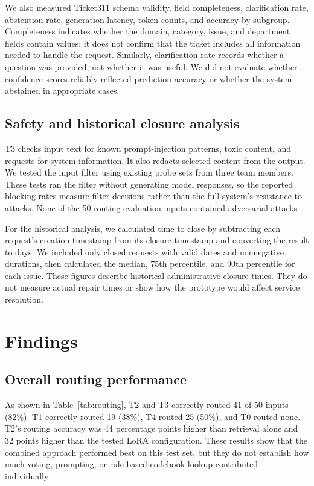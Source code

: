 \documentclass[11pt,letterpaper]{article}
\begin{document}
We also measured Ticket311 schema validity, field completeness, clarification rate, abstention rate, generation latency, token counts, and accuracy by subgroup. Completeness indicates whether the domain, category, issue, and department fields contain values; it does not confirm that the ticket includes all information needed to handle the request. Similarly, clarification rate records whether a question was provided, not whether it was useful. We did not evaluate whether confidence scores reliably reflected prediction accuracy or whether the system abstained in appropriate cases.

\subsection{Safety and historical closure analysis}

T3 checks input text for known prompt-injection patterns, toxic content, and requests for system information. It also redacts selected content from the output. We tested the input filter using existing probe sets from three team members. These tests ran the filter without generating model responses, so the reported blocking rates measure filter decisions rather than the full system's resistance to attacks. None of the 50 routing evaluation inputs contained adversarial attacks~\cite{team}.

For the historical analysis, we calculated time to close by subtracting each request's creation timestamp from its closure timestamp and converting the result to days. We included only closed requests with valid dates and nonnegative durations, then calculated the median, 75th percentile, and 90th percentile for each issue. These figures describe historical administrative closure times. They do not measure actual repair times or show how the prototype would affect service resolution.

\section{Findings}

\subsection{Overall routing performance}

As shown in Table~\ref{tab:routing}, T2 and T3 correctly routed 41 of 50 inputs (82\%). T1 correctly routed 19 (38\%), T4 routed 25 (50\%), and T0 routed none. T2's routing accuracy was 44 percentage points higher than retrieval alone and 32 points higher than the tested LoRA configuration. These results show that the combined approach performed best on this test set, but they do not establish how much voting, prompting, or rule-based codebook lookup contributed individually~\cite{team}.
\end{document}
